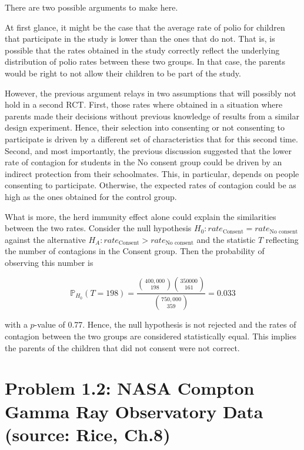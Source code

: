 \documentclass[11pt, english]{article}
\begin{document}
    There are two possible arguments to make here.

At first glance, it might be the case that the average rate of polio for
children that participate in the study is lower than the ones that do
not. That is, is possible that the rates obtained in the study correctly
reflect the underlying distribution of polio rates between these two
groups. In that case, the parents would be right to not allow their
children to be part of the study.

However, the previous argument relays in two assumptions that will
possibly not hold in a second RCT. First, those rates where obtained in
a situation where parents made their decisions without previous
knowledge of results from a similar design experiment. Hence, their
selection into consenting or not consenting to participate is driven by
a different set of characteristics that for this second time. Second,
and most importantly, the previous discussion suggested that the lower
rate of contagion for students in the No consent group could be driven
by an indirect protection from their schoolmates. This, in particular,
depends on people consenting to participate. Otherwise, the expected
rates of contagion could be as high as the ones obtained for the control
group.

What is more, the herd immunity effect alone could explain the
similarities between the two rates. Consider the null hypothesis
\(H_0 : rate_{\text{Consent}} = rate_{\text{No consent}}\) against the
alternative \(H_A : rate_{\text{Consent}} > rate_{\text{No consent}}\)
and the statistic \(T\) reflecting the number of contagions in the
Consent group. Then the probability of observing this number is

\[ \mathbb{P}_{H_0}(T = 198) = \frac{{400,000\choose 198}{350000\choose 161}}{{750,000\choose 359}} = 0.033\]

with a \(p\)-value of 0.77. Hence, the null hypothesis is not rejected
and the rates of contagion between the two groups are considered
statistically equal. This implies the parents of the children that did
not consent were not correct.

    \hypertarget{problem-1.2-nasa-compton-gamma-ray-observatory-data-source-rice-ch.8}{%
\section*{\texorpdfstring{\textbf{Problem 1.2:} NASA Compton Gamma Ray
Observatory Data (source: Rice,
Ch.8)}{Problem 1.2: NASA Compton Gamma Ray Observatory Data (source: Rice, Ch.8)}}\label{problem-1.2-nasa-compton-gamma-ray-observatory-data-source-rice-ch.8}}
\end{document}
